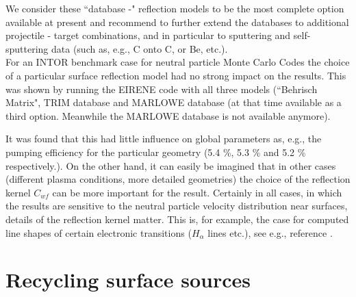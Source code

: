 We consider these ``database -" reflection models to be the most
complete option available at present and recommend to further
extend the databases to additional projectile - target
combinations, and in particular to sputtering and self-sputtering
data (such as, e.g., C onto C, or Be, etc.).
\\ For an INTOR benchmark case for neutral particle Monte Carlo Codes
\cite{kn:Benchmark} the choice of a particular surface reflection
model had no strong impact on the results. This was shown by
running the EIRENE code with all three models (``Behrisch Matrix",
TRIM database and MARLOWE database (at that time available as a
third option. Meanwhile the MARLOWE database is not available
anymore).

It was found that this had little influence on global parameters
as, e.g., the pumping efficiency for the particular geometry (5.4
\%, 5.3 \% and 5.2 \% respectively.). On the other hand, it can
easily be imagined that in other cases (different plasma
conditions, more detailed geometries) the choice of the reflection
kernel $ C_{wf} $ can be more important for the result. Certainly
in all cases, in which the results are sensitive to the neutral
particle velocity distribution near surfaces, details of the
reflection kernel matter. This is, for example, the case for
computed line shapes of certain electronic transitions ($
H_{\alpha} $ lines etc.), see e.g., reference \cite{kn:Reiter92d}.

\newpage
\section{Recycling surface sources} \label{sec1.4}

